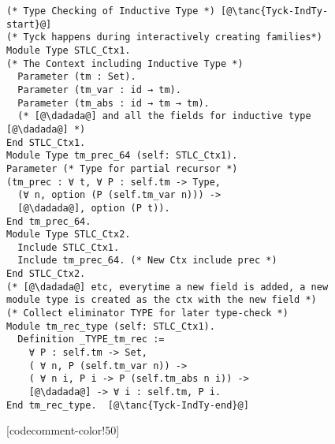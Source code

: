 \begin{figure}

\begin{minipage}{\textwidth}
\begin{multicols}{2}




\begin{lstlisting}
(* Type Checking of Inductive Type *) [@\tanc{Tyck-IndTy-start}@]
(* Tyck happens during interactively creating families*)
Module Type STLC_Ctx1. 
(* The Context including Inductive Type *)
  Parameter (tm : Set).
  Parameter (tm_var : id → tm).
  Parameter (tm_abs : id → tm → tm).
  (* [@\dadada@] and all the fields for inductive type [@\dadada@] *)
End STLC_Ctx1.
Module Type tm_prec_64 (self: STLC_Ctx1).
Parameter (* Type for partial recursor *)
(tm_prec : ∀ t, ∀ P : self.tm -> Type,
  (∀ n, option (P (self.tm_var n))) -> 
  [@\dadada@], option (P t)).
End tm_prec_64.
Module Type STLC_Ctx2.  
  Include STLC_Ctx1.
  Include tm_prec_64. (* New Ctx include prec *)
End STLC_Ctx2.
(* [@\dadada@] etc, everytime a new field is added, a new 
module type is created as the ctx with the new field *)
(* Collect eliminator TYPE for later type-check *)
Module tm_rec_type (self: STLC_Ctx1).
  Definition _TYPE_tm_rec :=
    ∀ P : self.tm -> Set,
    ( ∀ n, P (self.tm_var n)) ->
    ( ∀ n i, P i -> P (self.tm_abs n i)) ->
    [@\dadada@] -> ∀ i : self.tm, P i.
End tm_rec_type.  [@\tanc{Tyck-IndTy-end}@]
\end{lstlisting}

[codecomment-color!50]




\end{multicols}
\end{minipage}
\end{figure}

